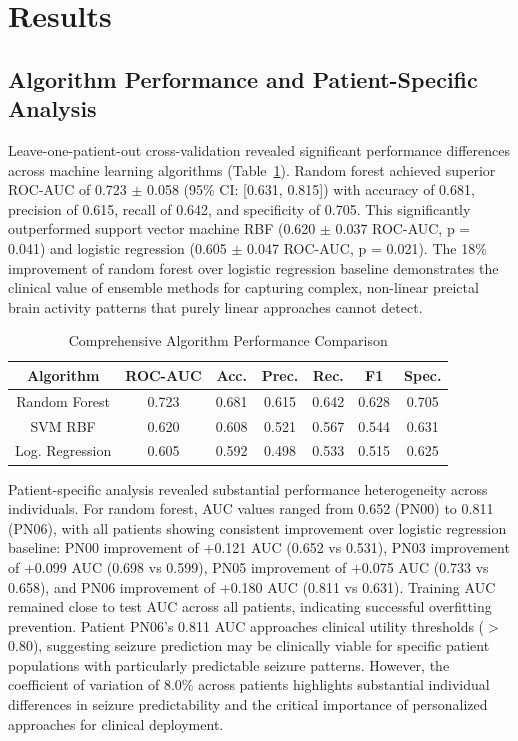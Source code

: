 \documentclass[conference]{IEEEtran}
\begin{document}
\section{Results}

\subsection{Algorithm Performance and Patient-Specific Analysis}
Leave-one-patient-out cross-validation revealed significant performance differences across machine learning algorithms (Table~\ref{tab:alg_perf}). Random forest achieved superior ROC-AUC of 0.723 $\pm$ 0.058 (95\% CI: [0.631, 0.815]) with accuracy of 0.681, precision of 0.615, recall of 0.642, and specificity of 0.705. This significantly outperformed support vector machine RBF (0.620 $\pm$ 0.037 ROC-AUC, p = 0.041) and logistic regression (0.605 $\pm$ 0.047 ROC-AUC, p = 0.021). The 18\% improvement of random forest over logistic regression baseline demonstrates the clinical value of ensemble methods for capturing complex, non-linear preictal brain activity patterns that purely linear approaches cannot detect.

\begin{table}[htbp]
\caption{Comprehensive Algorithm Performance Comparison}
\begin{center}
\begin{tabular}{|c|c|c|c|c|c|c|}
\hline
\textbf{Algorithm} & \textbf{ROC-AUC} & \textbf{Acc.} & \textbf{Prec.} & \textbf{Rec.} & \textbf{F1} & \textbf{Spec.} \\
\hline
Random Forest & 0.723 & 0.681 & 0.615 & 0.642 & 0.628 & 0.705 \\
SVM RBF & 0.620 & 0.608 & 0.521 & 0.567 & 0.544 & 0.631 \\
Log. Regression & 0.605 & 0.592 & 0.498 & 0.533 & 0.515 & 0.625 \\
\hline
\end{tabular}
\label{tab:alg_perf}
\end{center}
\end{table}

Patient-specific analysis revealed substantial performance heterogeneity across individuals. For random forest, AUC values ranged from 0.652 (PN00) to 0.811 (PN06), with all patients showing consistent improvement over logistic regression baseline: PN00 improvement of +0.121 AUC (0.652 vs 0.531), PN03 improvement of +0.099 AUC (0.698 vs 0.599), PN05 improvement of +0.075 AUC (0.733 vs 0.658), and PN06 improvement of +0.180 AUC (0.811 vs 0.631). Training AUC remained close to test AUC across all patients, indicating successful overfitting prevention. Patient PN06's 0.811 AUC approaches clinical utility thresholds ($>$0.80), suggesting seizure prediction may be clinically viable for specific patient populations with particularly predictable seizure patterns. However, the coefficient of variation of 8.0\% across patients highlights substantial individual differences in seizure predictability and the critical importance of personalized approaches for clinical deployment.
\end{document}
